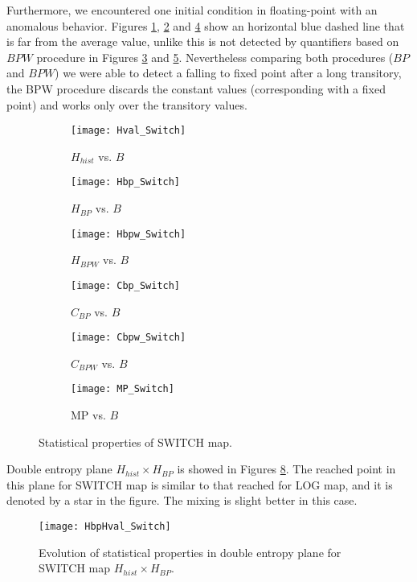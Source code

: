 Furthermore, we encountered one initial condition in floating-point with an anomalous behavior.
Figures \ref{fig:Hval_Switch}, \ref{fig:Hbp_Switch} and \ref{fig:Cbp_Switch} show an horizontal blue dashed line that is far from the average value, unlike this is not detected by quantifiers based on $BPW$ procedure in Figures \ref{fig:Hbpw_Switch} and \ref{fig:Cbpw_Switch}.
Nevertheless comparing both procedures ($BP$ and $BPW$) we were able to detect a falling to fixed point after a long transitory, the BPW procedure discards the constant values (corresponding with a fixed point) and works only over the transitory values.
%
\begin{figure}[H]
	\centering
	\begin{subfigure}[b]{0.49\textwidth}
		\texttt{[image: Hval\_Switch]}
		\caption{$H_{hist}$ vs. $B$}
		\label{fig:Hval_Switch}
	\end{subfigure}
	\begin{subfigure}[b]{0.49\textwidth}
		\texttt{[image: Hbp\_Switch]}
		\caption{$H_{BP}$ vs. $B$}
		\label{fig:Hbp_Switch}
	\end{subfigure}
	\begin{subfigure}[b]{0.49\textwidth}
		\texttt{[image: Hbpw\_Switch]}
		\caption{$H_{BPW}$ vs. $B$}
		\label{fig:Hbpw_Switch}
	\end{subfigure}
	\begin{subfigure}[b]{0.49\textwidth}
		\texttt{[image: Cbp\_Switch]}
		\caption{$C_{BP}$ vs. $B$}
		\label{fig:Cbp_Switch}
	\end{subfigure}
	\begin{subfigure}[b]{0.49\textwidth}
		\texttt{[image: Cbpw\_Switch]}
		\caption{$C_{BPW}$ vs. $B$}
		\label{fig:Cbpw_Switch}
	\end{subfigure}
	\begin{subfigure}[b]{0.49\textwidth}
		\texttt{[image: MP\_Switch]}
		\caption{MP vs. $B$}
		\label{fig:MP_Switch}
	\end{subfigure}
	\caption{Statistical properties of SWITCH map.}
	\label{fig:SWITCH_QuantiB}
\end{figure}

Double entropy plane $H_{hist} \times H_{BP}$ is showed in Figures \ref{fig:SWITCH_HH}.
The reached point in this plane for SWITCH map is similar to that reached for LOG map, and it is denoted by a star in the figure.
The mixing is slight better in this case.
%
\begin{figure}[H]
	\centering
	\texttt{[image: HbpHval\_Switch]}
	\caption{Evolution of statistical properties in double entropy plane for SWITCH map $H_{hist} \times H_{BP}$.}
	\label{fig:SWITCH_HH}
\end{figure}


